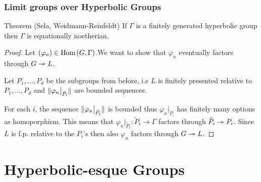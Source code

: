 \documentclass{beamer}[10]
\renewcommand{\hom}{\text{Hom}}
\begin{document}
\begin{frame}
    \frametitle{Limit groups over Hyperbolic Groups}
    \vspace*{-3pt}
    \pause
    \begin{block}{Theorem (Sela, Weidmann-Reinfeldt)}
        If $\Gamma$ is a finitely generated hyperbolic group then $\Gamma$ is equationally noetherian.
    \end{block}
    \pause
    \vspace*{-3pt}
    \begin{proof}
        Let $\rb{\varphi_n} \in \hom\rb{G,\Gamma}$.\pause We want to show that $\varphi_n$ eventually factors through $G \twoheadrightarrow L$.\pause

        Let $P_1,\ldots , P_d$ be the subgroups from before\pause, i.e $L$ is finitely presented relative to $P_1,\ldots , P_d$ and $\lVert \varphi_{n}\big\vert_{\tilde{P}_i} \rVert$ are bounded sequences.\pause

        For each $i$, the sequence $\lVert \varphi_{n}\big\vert_{\tilde{P}_i} \rVert$ is bounded thus $\varphi_{n}\big\vert_{\tilde{P}_i}$ has finitely many options as homoporphism.
        \pause This means that $\varphi_{n}\big\vert_{\tilde{P}_i} : \tilde{P}_i \to \Gamma$ factors through $\tilde{P}_i\twoheadrightarrow P_i$. \pause Since $L$ is f.p. relative to the $P_i$'s then also $\varphi_n$ factors through $G\twoheadrightarrow L$.

    \end{proof}
\end{frame}

\section*{Hyperbolic-esque Groups}
\end{document}
